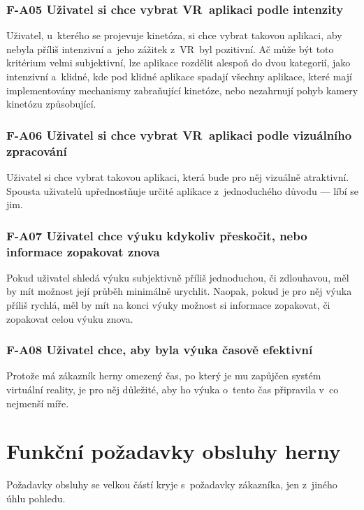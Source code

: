 \subsubsection*{F-A05 Uživatel si chce vybrat VR~aplikaci podle intenzity}
Uživatel, u~kterého se projevuje kinetóza, si chce vybrat takovou
aplikaci, aby nebyla příliš intenzivní a~jeho zážitek z~VR~byl
pozitivní. Ač může být toto kritérium velmi subjektivní, lze aplikace
rozdělit alespoň do dvou kategorií, jako intenzivní a~klidné, kde pod
klidné aplikace spadají všechny aplikace, které mají implementovány
mechanismy zabraňující kinetóze, nebo nezahrnují pohyb kamery kinetózu
způsobující.

\subsubsection*{F-A06 Uživatel si chce vybrat VR~aplikaci podle vizuálního
zpracování}
Uživatel si chce vybrat takovou aplikaci, která bude pro něj vizuálně
atraktivní. Spousta uživatelů upřednostňuje určité aplikace
z~jednoduchého důvodu --- líbí se jim.

\subsubsection*{F-A07 Uživatel chce výuku kdykoliv přeskočit, nebo informace
zopakovat znova} 
Pokud uživatel shledá výuku subjektivně příliš
jednoduchou, či zdlouhavou, měl by mít možnost její průběh minimálně
urychlit. Naopak, pokud je pro něj výuka příliš rychlá, měl by mít na
konci výuky možnost si informace zopakovat, či zopakovat celou výuku
znova.

\subsubsection*{F-A08 Uživatel chce, aby byla výuka časově efektivní}
Protože má zákazník herny omezený čas, po který je mu zapůjčen systém
virtuální reality, je pro něj důležité, aby ho výuka o~tento čas
připravila v~co nejmenší míře.

\newpage

\section{Funkční požadavky obsluhy
herny}\label{funkux10dnuxed-poux17eadavky-obsluhy-herny}

Požadavky obsluhy se velkou částí kryje s~požadavky zákazníka, jen
z~jiného úhlu pohledu.

